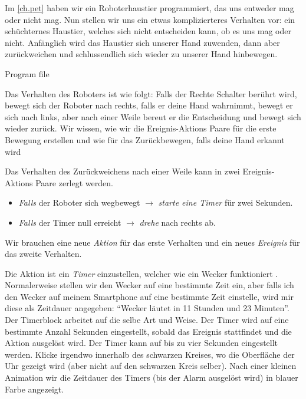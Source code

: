 
Im \cref{ch.pet} haben wir ein Roboterhaustier programmiert,
das uns entweder mag oder nicht mag.
Nun stellen wir uns ein etwas komplizierteres  Verhalten vor:
ein schüchternes Haustier, welches sich nicht entscheiden kann,
ob es uns mag oder nicht. Anfänglich wird das Haustier sich unserer Hand zuwenden,
dann aber zurückweichen und schlussendlich sich wieder zu unserer Hand hinbewegen.

{\raggedleft \hfill Program file }

Das Verhalten des Roboters ist wie folgt: Falls der Rechte Schalter berührt wird, bewegt sich der Roboter nach rechts, falls er deine Hand wahrnimmt, bewegt er sich nach links, aber nach einer Weile bereut er die Entscheidung und bewegt sich wieder zurück. Wir wissen, wie wir die Ereignis-Aktions Paare für die erste Bewegung erstellen
und wie für das Zurückbewegen, falls deine Hand erkannt wird

Das Verhalten des Zurückweichens nach einer Weile kann in zwei Ereignis-Aktions Paare zerlegt werden.

\begin{itemize}

\item \emph{Falls} der Roboter sich wegbewegt $\rightarrow$
\emph{starte eine Timer} für zwei Sekunden.

\item \emph{Falls} der Timer null erreicht $\rightarrow$ \emph{drehe}
nach rechts ab.

\end{itemize}

Wir brauchen eine neue \emph{Aktion} für das erste Verhalten und ein neues \emph{Ereignis} für das zweite Verhalten.

Die Aktion ist ein \emph{Timer} einzustellen, welcher wie ein Wecker funktioniert .  Normalerweise stellen wir den Wecker auf eine bestimmte Zeit ein, aber falls ich den Wecker auf meinem Smartphone auf eine bestimmte Zeit einstelle, wird mir diese als Zeitdauer angegeben: ``Wecker läutet in 11 Stunden und 23 Minuten''. Der Timerblock arbeitet auf die selbe Art und Weise. Der Timer wird auf eine bestimmte Anzahl Sekunden eingestellt, sobald das Ereignis stattfindet und die Aktion ausgelöst wird. Der Timer kann auf bis zu vier Sekunden eingestellt werden. Klicke irgendwo innerhalb des schwarzen Kreises, wo die Oberfläche der Uhr gezeigt wird (aber nicht auf den schwarzen Kreis selber). Nach einer kleinen Animation wir die Zeitdauer des Timers (bis der Alarm ausgelöst wird) in blauer Farbe angezeigt.


